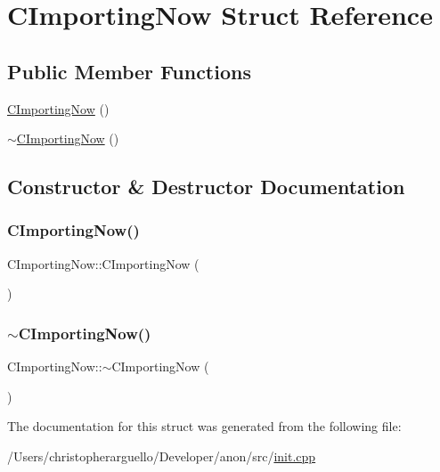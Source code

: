 \hypertarget{struct_c_importing_now}{}\section{C\+Importing\+Now Struct Reference}
\label{struct_c_importing_now}
\subsection*{Public Member Functions}
\begin{DoxyCompactItemize}
\item 
\mbox{\hyperlink{struct_c_importing_now_a435755fb20c95b11feaa407210f1630a}{C\+Importing\+Now}} ()
\item 
\mbox{\hyperlink{struct_c_importing_now_a0e449b23ac612ff3ff491d989fd08a18}{$\sim$\+C\+Importing\+Now}} ()
\end{DoxyCompactItemize}


\subsection{Constructor \& Destructor Documentation}
\mbox{\label{struct_c_importing_now_a435755fb20c95b11feaa407210f1630a}} 
\subsubsection{\texorpdfstring{C\+Importing\+Now()}{CImportingNow()}}
{\footnotesize\ttfamily C\+Importing\+Now\+::\+C\+Importing\+Now (\begin{DoxyParamCaption}{ }\end{DoxyParamCaption})\hspace{0.3cm}{\ttfamily [inline]}}

\mbox{\label{struct_c_importing_now_a0e449b23ac612ff3ff491d989fd08a18}} 
\subsubsection{\texorpdfstring{$\sim$\+C\+Importing\+Now()}{~CImportingNow()}}
{\footnotesize\ttfamily C\+Importing\+Now\+::$\sim$\+C\+Importing\+Now (\begin{DoxyParamCaption}{ }\end{DoxyParamCaption})\hspace{0.3cm}{\ttfamily [inline]}}



The documentation for this struct was generated from the following file\+:\begin{DoxyCompactItemize}
\item 
/\+Users/christopherarguello/\+Developer/anon/src/\mbox{\hyperlink{init_8cpp}{init.\+cpp}}\end{DoxyCompactItemize}
